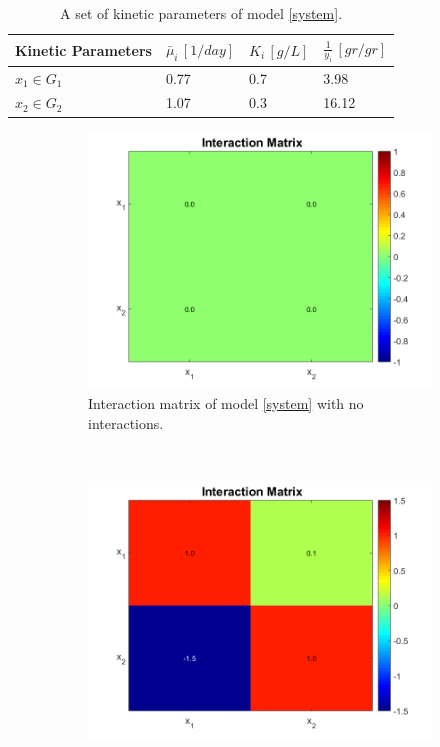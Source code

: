 \documentclass[processes,article,submit,moreauthors,pdftex]{Definitions/mdpi}
\begin{document}
\begin{table}[ht]
	\centering
	\begin{tabular}{|l|l|l|l|}
		\hline
		Kinetic Parameters & $\bar{\mu}_i\,[1/day]$ & $K_i\,[g/L]$ & $\frac{1}{y_i} \, [gr/gr]$ \\ \hline
		$x_1 \in G_1$ & 0.77  & 0.7 & 3.98  \\ \hline
		$x_2\in G_2$ & 1.07 & 0.3 &  16.12 \\ \hline
	\end{tabular}	
	\caption{A set of kinetic parameters of model \eqref{system}.}
	\label{kinetic_parameters_case_study_1}
\end{table}

\begin{figure}[h]
	\centering
	\begin{subfigure}[b]{0.45\textwidth}
		\includegraphics[width = \textwidth]{Stability/Interactions_case_study_1_no_interactions}
		\caption{Interaction matrix of model \eqref{system} with no interactions.}
		\label{case1_no_interactions}
	\end{subfigure}
	~
	\begin{subfigure}[b]{0.45\textwidth}
		\includegraphics[width = \textwidth]{Stability/Interactions_case_study_1}

\end{subfigure}
\end{figure}
\end{document}
